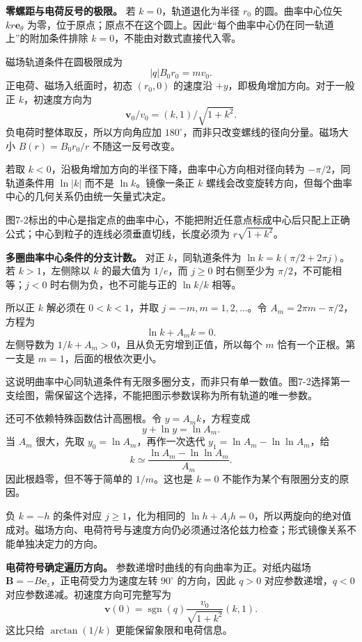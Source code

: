 \documentclass[12pt,a4paper,UTF8]{ctexart}
\begin{document}
\textbf{零螺距与电荷反号的极限。} 若 \(k=0\)，轨道退化为半径 \(r_0\)
的圆。曲率中心位矢 \(kr\bm e_\theta\)
为零，位于原点；原点不在这个圆上。因此``每个曲率中心仍在同一轨道上''的附加条件排除
\(k=0\)，不能由对数式直接代入零。

磁场轨道条件在圆极限成为 \[
|q|B_0r_0=mv_0.
\] 正电荷、磁场入纸面时，初态 \((r_0,0)\) 的速度沿
\(+y\)，即极角增加方向。对于一般正 \(k\)，初速度方向为 \[
\bm v_0/v_0=(k,1)/\sqrt{1+k^2}.
\] 负电荷时整体取反，所以方向角应加
\(180^\circ\)，而非只改变螺线的径向分量。磁场大小 \(B(r)=B_0r_0/r\)
不随这一反号改变。

若取 \(k<0\)，沿极角增加方向的半径下降，曲率中心方向相对径向转为
\(-\pi/2\)，同轨道条件用 \(\ln|k|\) 而不是 \(\ln k\)。镜像一条正 \(k\)
螺线会改变旋转方向，但每个曲率中心的几何关系仍由统一矢量式决定。

图7-2标出的中心是指定点的曲率中心，不能把附近任意点标成中心后只配上正确公式；中心到粒子的连线必须垂直切线，长度必须为
\(r\sqrt{1+k^2}\)。

\textbf{多圈曲率中心条件的分支计数。} 对正 \(k\)，同轨道条件为
\(\ln k=k(\pi/2+2\pi j)\)。若 \(k>1\)，左侧除以 \(k\) 的最大值为
\(1/e\)，而 \(j\ge0\) 时右侧至少为 \(\pi/2\)，不可能相等；\(j<0\)
时右侧为负，也不可能与正的 \(\ln k/k\) 相等。

所以正 \(k\) 解必须在 \(0<k<1\)，并取 \(j=-m,m=1,2,\ldots\)。令
\(A_m=2\pi m-\pi/2\)，方程为 \[
\ln k+A_mk=0.
\] 左侧导数为 \(1/k+A_m>0\)，且从负无穷增到正值，所以每个 \(m\)
恰有一个正根。第一支是 \(m=1\)，后面的根依次更小。

这说明曲率中心同轨道条件有无限多圈分支，而非只有单一数值。图7-2选择第一支绘图，需保留这个选择，不能把图示参数误称为所有轨道的唯一参数。

还可不依赖特殊函数估计高圈根。令 \(y=A_mk\)，方程变成 \[
y+\ln y=\ln A_m.
\] 当 \(A_m\) 很大，先取 \(y_0=\ln A_m\)，再作一次迭代
\(y_1=\ln A_m-\ln\ln A_m\)，给 \[
k\simeq\frac{\ln A_m-\ln\ln A_m}{A_m}.
\] 因此根趋零，但不等于简单的 \(1/m\)。这也是 \(k=0\)
不能作为某个有限圈分支的原因。

负 \(k=-h\) 的条件对应 \(j\ge1\)，化为相同的
\(\ln h+A_jh=0\)，所以两旋向的绝对值成对。磁场方向、电荷符号与速度方向仍必须通过洛伦兹力检查；形式镜像关系不能单独决定力的方向。

\textbf{电荷符号确定遍历方向。} 参数递增时曲线的有向曲率为正。对纸内磁场
\(\bm B=-B\bm e_z\)，正电荷受力为速度左转 \(90^\circ\) 的方向，因此
\(q>0\) 对应参数递增，\(q<0\) 对应参数递减。初速度方向可完整写为 \[
\bm v(0)=\operatorname{sgn}(q)\frac{v_0}{\sqrt{1+k^2}}(k,1).
\] 这比只给 \(\arctan(1/k)\) 更能保留象限和电荷信息。
\end{document}
